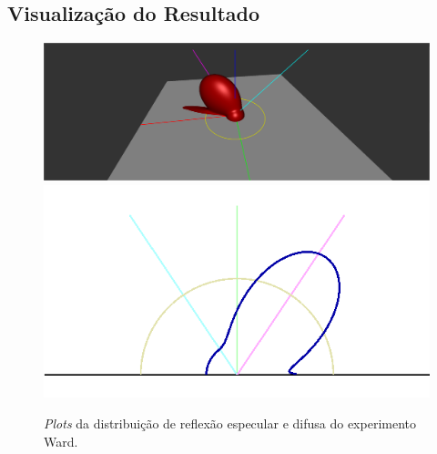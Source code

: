 \subsection{Visualização do Resultado}
\begin{figure}[H]
    \caption{\small{\textit{Plots} da distribuição de reflexão especular e difusa do experimento Ward.}}
    \label{fig-ward-plots}

    \vspace{42px}
  \includegraphics[width=\linewidth]{./Imagens/brdfs/ward-3D-plot}
\endminipage\hfill
{}
  \includegraphics[width=\linewidth]{./Imagens/brdfs/ward-polar-plot.png}
\endminipage\hfill
\end{figure}


